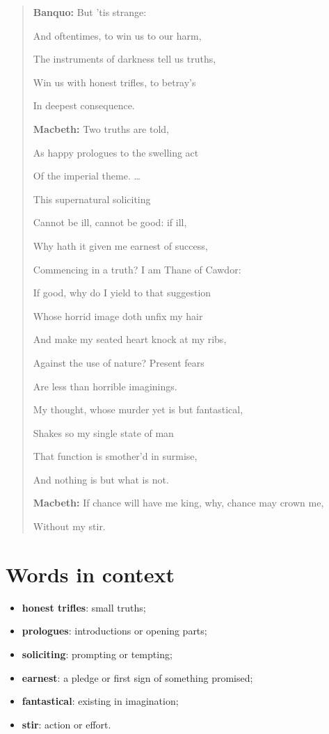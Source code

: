 \documentclass[11pt]{article}
\newenvironment{playpassage}{%
  \begin{quote}\small\setlength{\parskip}{0.08em}\setlength{\parindent}{0pt}%
}{\end{quote}}
\newcommand{\speaker}[1]{\textbf{#1:}}
\begin{document}
\begin{playpassage}
\speaker{Banquo} But 'tis strange:\par
And oftentimes, to win us to our harm,\par
The instruments of darkness tell us truths,\par
Win us with honest trifles, to betray's\par
In deepest consequence.

\speaker{Macbeth} Two truths are told,\par
As happy prologues to the swelling act\par
Of the imperial theme. \ldots\par
This supernatural soliciting\par
Cannot be ill, cannot be good: if ill,\par
Why hath it given me earnest of success,\par
Commencing in a truth? I am Thane of Cawdor:\par
If good, why do I yield to that suggestion\par
Whose horrid image doth unfix my hair\par
And make my seated heart knock at my ribs,\par
Against the use of nature? Present fears\par
Are less than horrible imaginings.\par
My thought, whose murder yet is but fantastical,\par
Shakes so my single state of man\par
That function is smother'd in surmise,\par
And nothing is but what is not.

\speaker{Macbeth} If chance will have me king, why, chance may crown me,\par
Without my stir.
\end{playpassage}

\section*{Words in context}

\begin{itemize}
\item \textbf{honest trifles}: small truths;
\item \textbf{prologues}: introductions or opening parts;
\item \textbf{soliciting}: prompting or tempting;
\item \textbf{earnest}: a pledge or first sign of something promised;
\item \textbf{fantastical}: existing in imagination;
\item \textbf{stir}: action or effort.
\end{itemize}
\end{document}
